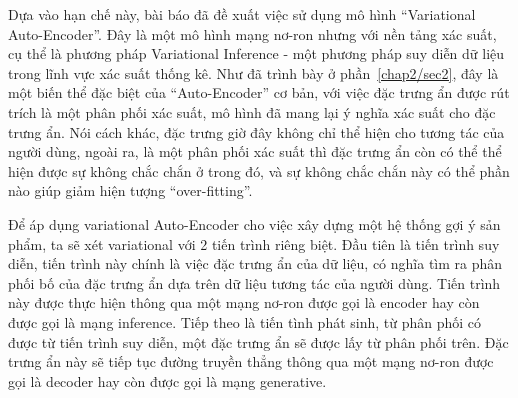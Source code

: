     Dựa vào hạn chế này, bài báo đã đề xuất việc sử dụng mô hình ``Variational Auto-Encoder''. 
    Đây là một mô hình mạng nơ-ron nhưng với nền tảng xác suất, cụ thể là phương pháp Variational Inference - một phương pháp suy diễn dữ liệu trong lĩnh vực xác suất thống kê.
    Như đã trình bày ở phần~\ref{chap2/sec2}, đây là một biến thể đặc biệt của ``Auto-Encoder'' cơ bản, với việc đặc trưng ẩn được rút trích là một phân phối xác suất, mô hình đã mang lại ý nghĩa xác suất cho đặc trưng ẩn.
    Nói cách khác, đặc trưng giờ đây không chỉ thể hiện cho tương tác của người dùng, ngoài ra, là một phân phối xác suất thì đặc trưng ẩn còn có thể thể hiện được sự không chắc chắn ở trong đó, và sự không chắc chắn này có thể phần nào giúp giảm hiện tượng ``over-fitting''.



    
    Để áp dụng variational Auto-Encoder cho việc xây dựng một hệ thống gợi ý sản phẩm, ta sẽ xét variational với 2 tiến trình riêng biệt. 
    Đầu tiên là tiến trình suy diễn, tiến trình này chính là việc đặc trưng ẩn của dữ liệu, có nghĩa tìm ra phân phối bố của đặc trưng ẩn dựa trên dữ liệu tương tác của người dùng. 
    Tiến trình này được thực hiện thông qua một mạng nơ-ron được gọi là encoder hay còn được gọi là mạng inference.
    Tiếp theo là tiến tình phát sinh, từ phân phối có được từ tiến trình suy diễn, một đặc trưng ẩn sẽ được lấy từ phân phối trên. 
    Đặc trưng ẩn này sẽ tiếp tục đường truyền thẳng thông qua một mạng nơ-ron được gọi là decoder hay còn được gọi là mạng generative.




